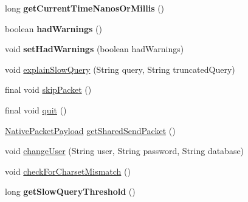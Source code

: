 \begin{DoxyCompactItemize}
\item 
\mbox{\label{classcom_1_1mysql_1_1cj_1_1protocol_1_1a_1_1_native_protocol_a7a77ee9634831da978a24f31db0d707c}} 
long {\bfseries get\+Current\+Time\+Nanos\+Or\+Millis} ()
\item 
\mbox{\label{classcom_1_1mysql_1_1cj_1_1protocol_1_1a_1_1_native_protocol_aa344264ddc21778b27e8326895ae9a7d}} 
boolean {\bfseries had\+Warnings} ()
\item 
\mbox{\label{classcom_1_1mysql_1_1cj_1_1protocol_1_1a_1_1_native_protocol_ad607806214c9cd9d57d58405f324496f}} 
void {\bfseries set\+Had\+Warnings} (boolean had\+Warnings)
\item 
void \mbox{\hyperlink{classcom_1_1mysql_1_1cj_1_1protocol_1_1a_1_1_native_protocol_a93ebc419a4b890f9567644c44f72a6a9}{explain\+Slow\+Query}} (String query, String truncated\+Query)
\item 
final void \mbox{\hyperlink{classcom_1_1mysql_1_1cj_1_1protocol_1_1a_1_1_native_protocol_ab344b89498bf035e0e8381f5999f1ead}{skip\+Packet}} ()
\item 
final void \mbox{\hyperlink{classcom_1_1mysql_1_1cj_1_1protocol_1_1a_1_1_native_protocol_a068e7a1606a75477e944516d5888ef2a}{quit}} ()
\item 
\mbox{\hyperlink{classcom_1_1mysql_1_1cj_1_1protocol_1_1a_1_1_native_packet_payload}{Native\+Packet\+Payload}} \mbox{\hyperlink{classcom_1_1mysql_1_1cj_1_1protocol_1_1a_1_1_native_protocol_a9ce262e6311a36690401851050b47899}{get\+Shared\+Send\+Packet}} ()
\item 
void \mbox{\hyperlink{classcom_1_1mysql_1_1cj_1_1protocol_1_1a_1_1_native_protocol_a7f356b98ad856e135cfbdcae35d87009}{change\+User}} (String user, String password, String database)
\item 
void \mbox{\hyperlink{classcom_1_1mysql_1_1cj_1_1protocol_1_1a_1_1_native_protocol_a08c79e079662813e512c6fe30cfb5fdd}{check\+For\+Charset\+Mismatch}} ()
\item 
\mbox{\label{classcom_1_1mysql_1_1cj_1_1protocol_1_1a_1_1_native_protocol_a6cea7c094360051de8781b7fe2ea87ae}} 
long {\bfseries get\+Slow\+Query\+Threshold} ()
\item 

\end{DoxyCompactItemize}
